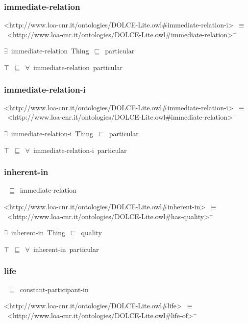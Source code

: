 \documentclass{article}
\begin{document}
\subsubsection*{immediate-relation}

<http://www.loa-cnr.it/ontologies/DOLCE-Lite.owl#immediate-relation-i>~\ensuremath{\equiv}~<http://www.loa-cnr.it/ontologies/DOLCE-Lite.owl#immediate-relation>\ensuremath{^-}

\ensuremath{\exists}~immediate-relation~Thing~\ensuremath{\sqsubseteq}~particular

\ensuremath{\top}~\ensuremath{\sqsubseteq}~\ensuremath{\forall}~immediate-relation~particular

\subsubsection*{immediate-relation-i}

<http://www.loa-cnr.it/ontologies/DOLCE-Lite.owl#immediate-relation-i>~\ensuremath{\equiv}~<http://www.loa-cnr.it/ontologies/DOLCE-Lite.owl#immediate-relation>\ensuremath{^-}

\ensuremath{\exists}~immediate-relation-i~Thing~\ensuremath{\sqsubseteq}~particular

\ensuremath{\top}~\ensuremath{\sqsubseteq}~\ensuremath{\forall}~immediate-relation-i~particular

\subsubsection*{inherent-in}

~\ensuremath{\sqsubseteq}~immediate-relation

<http://www.loa-cnr.it/ontologies/DOLCE-Lite.owl#inherent-in>~\ensuremath{\equiv}~<http://www.loa-cnr.it/ontologies/DOLCE-Lite.owl#has-quality>\ensuremath{^-}

\ensuremath{\exists}~inherent-in~Thing~\ensuremath{\sqsubseteq}~quality

\ensuremath{\top}~\ensuremath{\sqsubseteq}~\ensuremath{\forall}~inherent-in~particular

\subsubsection*{life}

~\ensuremath{\sqsubseteq}~constant-participant-in

<http://www.loa-cnr.it/ontologies/DOLCE-Lite.owl#life>~\ensuremath{\equiv}~<http://www.loa-cnr.it/ontologies/DOLCE-Lite.owl#life-of>\ensuremath{^-}
\end{document}
